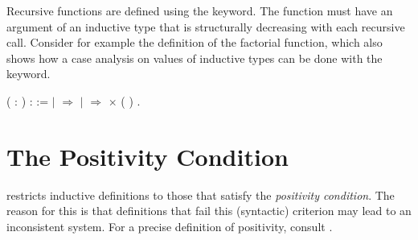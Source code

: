 Recursive functions are defined using the 
keyword. The function must have an argument of an inductive type that is
structurally decreasing with each recursive call. Consider for example the
definition of
the factorial function, which also shows how a case analysis on values
of inductive types can be done with the  keyword.
\begin{singlespace}
\begin{coqdoccode}
\coqdocnoindent
{}
( :
)
:
:=\coqdoceol
\coqdocindent{1.00em}
  \coqdoceol
\coqdocindent{1.00em}
\ensuremath{|}
\ensuremath{\Rightarrow}
\coqdoceol
\coqdocindent{1.00em}
\ensuremath{|}
 \ensuremath{\Rightarrow}
 \ensuremath{\times}
(
)\coqdoceol
\coqdocindent{1.00em}
.\coqdoceol
\end{coqdoccode}
\end{singlespace}


%


\section{The Positivity Condition}\label{sec:positivity}

\Coq restricts inductive definitions to those that satisfy the
\emph{positivity condition}. The reason for this is that definitions
that fail this (syntactic) criterion may lead to an inconsistent
  system. For a precise definition of positivity, consult
  .

